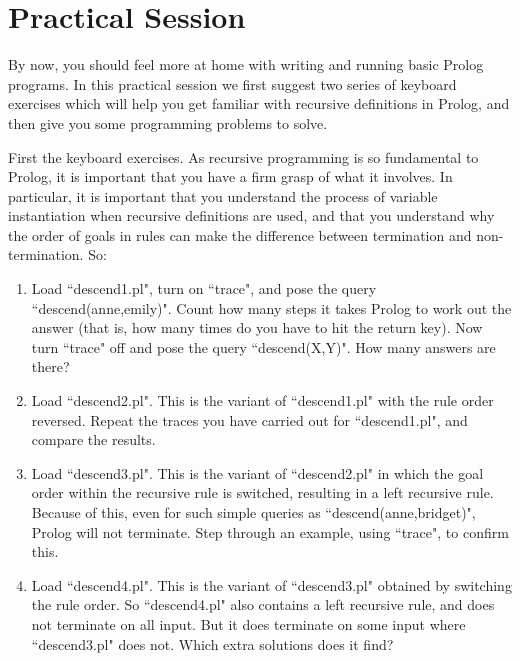 \section{Practical Session}\label{SEC.L3.PRAXIS}



By now, you should feel more at home with writing and running basic
Prolog programs. In this practical session we first suggest two series
of keyboard exercises which will help you get familiar with recursive
definitions in Prolog, and then give you some programming problems to
solve.

First the keyboard exercises. As recursive programming is so
fundamental to Prolog, it is important that you have a firm grasp of
what it involves. In particular, it is important that you understand
the process of variable instantiation when recursive definitions are
used, and that you understand why the order of goals in rules can make
the difference between termination and non-termination. So:

\begin{enumerate}


\item{} Load ``descend1.pl", turn on ``trace", and pose the query
``descend(anne,emily)". Count how many steps it takes Prolog to work
out the answer (that is, how many times do you have to hit the return
key).  Now turn ``trace" off and pose the query ``descend(X,Y)". How
many answers are there?

\item{}Load ``descend2.pl". This is the variant of ``descend1.pl" with
the rule order reversed. Repeat the traces you have
carried out for ``descend1.pl", and compare the results.

\item{}Load ``descend3.pl". This is the variant of ``descend2.pl" in
which the goal order within the recursive rule is switched, resulting
in a left recursive rule.  Because of this, even for such simple
queries as ``descend(anne,bridget)", Prolog will not terminate.  Step
through an example, using ``trace", to confirm this.

\item{}Load ``descend4.pl". This is the variant of ``descend3.pl"
obtained by switching the rule order.  So ``descend4.pl" also contains
a left recursive rule, and does not terminate on all input.  But it
does terminate on some input where ``descend3.pl" does not.  Which
extra solutions does it find?

\end{enumerate}

